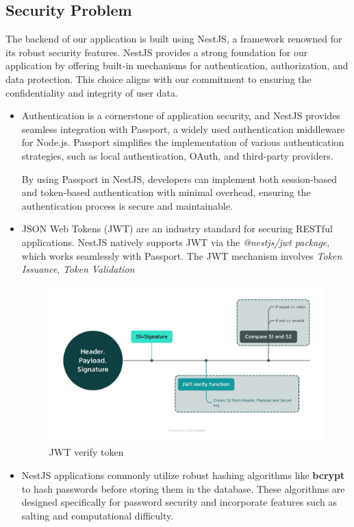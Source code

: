 \documentclass{article}
\begin{document}
\subsection{Security Problem}
The backend of our application is built using NestJS, a framework renowned for its robust security features. NestJS provides a strong foundation for our application by offering built-in mechanisms for authentication, authorization, and data protection. This choice aligns with our commitment to ensuring the confidentiality and integrity of user data.
\begin{itemize}
\item 
    Authentication is a cornerstone of application security, and NestJS provides seamless integration with Passport, a widely used authentication middleware for Node.js. Passport simplifies the implementation of various authentication strategies, such as local authentication, OAuth, and third-party providers.
    
    By using Passport in NestJS, developers can implement both session-based and token-based authentication with minimal overhead, ensuring the authentication process is secure and maintainable.
\item 
JSON Web Tokens (JWT) are an industry standard for securing RESTful applications. NestJS natively supports JWT via the \textit{@nestjs/jwt package}, which works seamlessly with Passport. The JWT mechanism involves \textit{Token Issuance}, \textit{Token Validation}
\begin{figure}[H]
    \centering
    \includegraphics[width=0.75\linewidth]{jwt.png}
    \caption{JWT verify token}
    \label{fig:jwt}
\end{figure}

\item NestJS applications commonly utilize robust hashing algorithms like \textbf{bcrypt} to hash passwords before storing them in the database. These algorithms are designed specifically for password security and incorporate features such as salting and computational difficulty.


\end{itemize}
\end{document}
